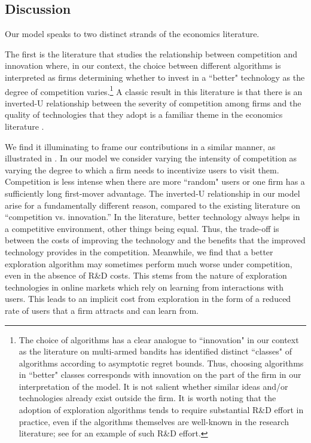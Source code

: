 
\subsection{Discussion}
\label{sec:intro-discussion}



 Our model speaks to two distinct strands of the economics literature.

The first is the literature that studies the relationship between competition and innovation where, in our context,  the choice between different algorithms is interpreted as firms determining whether to invest in a ``better" technology as the degree of competition varies.\footnote{The choice of algorithms has a clear analogue to ``innovation" in our context as the literature on multi-armed bandits has identified distinct ``classes" of algorithms according to asymptotic regret bounds. Thus, choosing algorithms in ``better" classes corresponds with innovation on the part of the firm in our interpretation of the model. It is not salient whether similar ideas and/or technologies already exist outside the firm. It is worth noting that the adoption of exploration algorithms tends to require substantial R\&D effort in practice, even if the algorithms themselves are well-known in the research literature; see \citet{MWT-WhitePaper-2016} for an example of such R\&D effort.} A classic result in this literature is that there is an inverted-U relationship between the severity of competition among firms and the quality of technologies that they adopt is a familiar theme in the economics literature \citep[\eg][]{Aghion-QJE05,Vives-08}.

We find it illuminating to frame our contributions in a similar manner, as illustrated in . In our model we consider varying the intensity of competition as varying the degree to which a firm needs to incentivize users to visit them. Competition is less intense when there are more ``random" users or one firm has a sufficiently long first-mover advantage. The inverted-U relationship in our model arise for a fundamentally different reason, compared to the existing literature on ``competition vs. innovation.'' In the literature, better technology always helps in a competitive environment, other things being equal. Thus, the trade-off is between the costs of improving the technology and the benefits that the improved technology provides in the competition. Meanwhile, we find that a better exploration algorithm may sometimes perform much worse under competition, even in the absence of R\&D costs. This stems from the nature of exploration technologies in online markets which rely on learning from interactions with users. This leads to an implicit cost from exploration in the form of a reduced rate of users that a firm attracts and can learn from.

